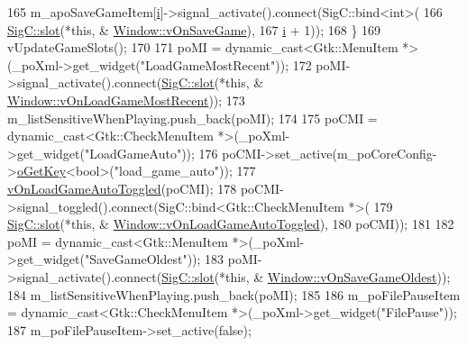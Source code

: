\begin{DoxyCode}
{{165     m\_apoSaveGameItem[\mbox{\hyperlink{expr-lex_8cpp_acb559820d9ca11295b4500f179ef6392}{i}}]->signal\_activate().connect(SigC::bind<int>(
166                                                       \mbox{\hyperlink{namespace_sig_c_a92e4f19202b77e78ac1db05f5a62f6b6}{SigC::slot}}(*\textcolor{keyword}{this}, &
      \mbox{\hyperlink{class_v_b_a_1_1_window_aa614f13101a25febb6f3c3805c947e3e}{Window::vOnSaveGame}}),
167                                                       \mbox{\hyperlink{expr-lex_8cpp_acb559820d9ca11295b4500f179ef6392}{i}} + 1));
168   \}
169   vUpdateGameSlots();
170 
171   poMI = \textcolor{keyword}{dynamic\_cast<}Gtk::MenuItem *\textcolor{keyword}{>}(\_poXml->get\_widget(\textcolor{stringliteral}{"LoadGameMostRecent"}));
172   poMI->signal\_activate().connect(\mbox{\hyperlink{namespace_sig_c_a92e4f19202b77e78ac1db05f5a62f6b6}{SigC::slot}}(*\textcolor{keyword}{this}, &
      \mbox{\hyperlink{class_v_b_a_1_1_window_ac73a836767434700186832ae1ea49cc5}{Window::vOnLoadGameMostRecent}}));
173   m\_listSensitiveWhenPlaying.push\_back(poMI);
174 
175   poCMI = \textcolor{keyword}{dynamic\_cast<}Gtk::CheckMenuItem *\textcolor{keyword}{>}(\_poXml->get\_widget(\textcolor{stringliteral}{"LoadGameAuto"}));
176   poCMI->set\_active(m\_poCoreConfig->\mbox{\hyperlink{class_v_b_a_1_1_config_1_1_section_ab169d7aae4e9dde91418ba1668e3ad39}{oGetKey}}<\textcolor{keywordtype}{bool}>(\textcolor{stringliteral}{"load\_game\_auto"}));
177   \mbox{\hyperlink{class_v_b_a_1_1_window_a9457e3b8fe1022c96a548e1169002f0c}{vOnLoadGameAutoToggled}}(poCMI);
178   poCMI->signal\_toggled().connect(SigC::bind<Gtk::CheckMenuItem *>(
179                                     \mbox{\hyperlink{namespace_sig_c_a92e4f19202b77e78ac1db05f5a62f6b6}{SigC::slot}}(*\textcolor{keyword}{this}, &
      \mbox{\hyperlink{class_v_b_a_1_1_window_a9457e3b8fe1022c96a548e1169002f0c}{Window::vOnLoadGameAutoToggled}}),
180                                     poCMI));
181 
182   poMI = \textcolor{keyword}{dynamic\_cast<}Gtk::MenuItem *\textcolor{keyword}{>}(\_poXml->get\_widget(\textcolor{stringliteral}{"SaveGameOldest"}));
183   poMI->signal\_activate().connect(\mbox{\hyperlink{namespace_sig_c_a92e4f19202b77e78ac1db05f5a62f6b6}{SigC::slot}}(*\textcolor{keyword}{this}, &
      \mbox{\hyperlink{class_v_b_a_1_1_window_ac582c9416136eaaf39469fc9eff83fee}{Window::vOnSaveGameOldest}}));
184   m\_listSensitiveWhenPlaying.push\_back(poMI);
185 
186   m\_poFilePauseItem = \textcolor{keyword}{dynamic\_cast<}Gtk::CheckMenuItem *\textcolor{keyword}{>}(\_poXml->get\_widget(\textcolor{stringliteral}{"FilePause"}));
187   m\_poFilePauseItem->set\_active(\textcolor{keyword}{false});
}}
\end{DoxyCode}
